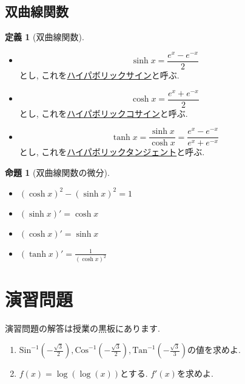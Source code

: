 \documentclass[dvipdfmx,a4paper,11pt]{article}
\newcommand{\Sin}{\text{Sin}^{-1}}
\newcommand{\Cos}{\text{Cos}^{-1}}
\newcommand{\Tan}{\text{Tan}^{-1}}
\theoremstyle{definition}
\newtheorem{prop}[thm]{命題}
\newtheorem{dfn}[thm]{定義}
\begin{document}
 \subsection{双曲線関数}
 
 \begin{tcolorbox}[
    colback = white,
    colframe = green!35!black,
    fonttitle = \bfseries,
    breakable = true]
    \begin{dfn}[双曲線関数]
    \text{}
 \begin{itemize}
 \item    $$
\sinh x = \frac{e^x - e^{-x}}{2}
$$
 とし, これを\underline{ハイパボリックサイン}と呼ぶ.
 \item    $$
\cosh x = \frac{e^x + e^{-x}}{2}
$$
 とし, これを\underline{ハイパボリックコサイン}と呼ぶ.
 \item    $$
\tanh x = \frac{\sinh x}{\cosh x}= \frac{e^x - e^{-x}}{e^x + e^{-x}}
$$
 とし, これを\underline{ハイパボリックタンジェント}と呼ぶ.
 \end{itemize}
 \end{dfn}
   \end{tcolorbox}
   
       \begin{tcolorbox}[
    colback = white,
    colframe = green!35!black,
    fonttitle = \bfseries,
    breakable = true]
    \begin{prop}[双曲線関数の微分]
    \text{}
 \begin{itemize}
\item $(\cosh x)^2 - (\sinh x)^2 = 1$ 
 \item  $(\sinh x)' = \cosh x$
 \item  $(\cosh x)' = \sinh x$
  \item  $(\tanh x)' = \frac{1}{(\cosh x)^2}$
 \end{itemize}
 \end{prop}
   \end{tcolorbox}


 
\section{演習問題}
演習問題の解答は授業の黒板にあります.
\begin{enumerate}
\item $\Sin(- \frac{\sqrt{3}}{2}), \Cos(- \frac{\sqrt{3}}{2}), \Tan(- \frac{\sqrt{3}}{3})$の値を求めよ.
\item $f(x) = \log(\log (x))$とする. $f'(x)$を求めよ.
\end{enumerate}
\end{document}
